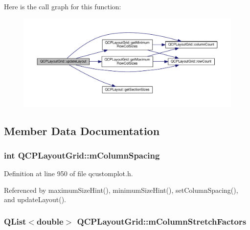 Here is the call graph for this function\+:\nopagebreak
\begin{figure}[H]
\begin{center}
\leavevmode
\includegraphics[width=350pt]{class_q_c_p_layout_grid_a07f8dd7d3d61d7345026621d446042a4_cgraph}
\end{center}
\end{figure}




\subsection{Member Data Documentation}
\hypertarget{class_q_c_p_layout_grid_ae9ac48f0791be07ead0a96dbd5622770}{}
\subsubsection[{m\+Column\+Spacing}]{\setlength{\rightskip}{0pt plus 5cm}int Q\+C\+P\+Layout\+Grid\+::m\+Column\+Spacing\hspace{0.3cm}{\ttfamily [protected]}}\label{class_q_c_p_layout_grid_ae9ac48f0791be07ead0a96dbd5622770}


Definition at line 950 of file qcustomplot.\+h.



Referenced by maximum\+Size\+Hint(), minimum\+Size\+Hint(), set\+Column\+Spacing(), and update\+Layout().

\hypertarget{class_q_c_p_layout_grid_ac6aabe62339f94f18b9f8adab94b1840}{}
\subsubsection[{m\+Column\+Stretch\+Factors}]{\setlength{\rightskip}{0pt plus 5cm}Q\+List$<$double$>$ Q\+C\+P\+Layout\+Grid\+::m\+Column\+Stretch\+Factors\hspace{0.3cm}{\ttfamily [protected]}}\label{class_q_c_p_layout_grid_ac6aabe62339f94f18b9f8adab94b1840}


